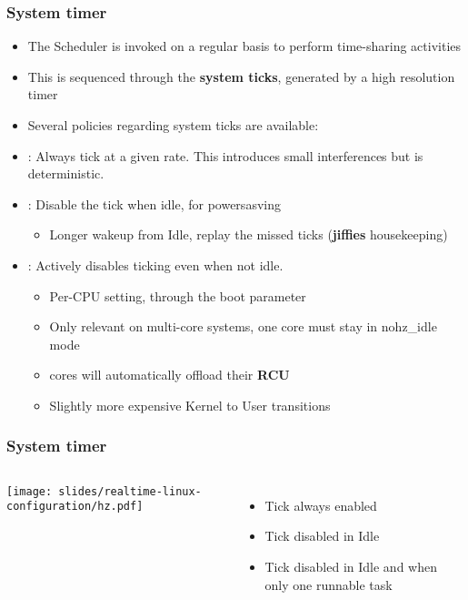 \begin{frame}
	\frametitle{System timer}
	\begin{itemize}
		\item The Scheduler is invoked on a regular basis to perform time-sharing activities
		\item This is sequenced through the \textbf{system ticks}, generated by a high resolution timer
		\item Several policies regarding system ticks are available:
		\item {}: Always tick at a given rate. This introduces small interferences but is deterministic.
		\item {}: Disable the tick when idle, for powersasving
			\begin{itemize}
				\item Longer wakeup from Idle, replay the missed ticks (\textbf{jiffies} housekeeping)
			\end{itemize}
		\item {}: Actively disables ticking even when not idle.
			\begin{itemize}
				\item Per-CPU setting, through the  boot parameter
				\item Only relevant on multi-core systems, one core must stay in nohz\_idle mode
				\item {} cores will automatically offload their \textbf{RCU}
				\item Slightly more expensive Kernel to User transitions
			\end{itemize}
	\end{itemize}
\end{frame}

\begin{frame}
	\frametitle{System timer}
	\begin{columns}
	\texttt{[image: slides/realtime-linux-configuration/hz.pdf]}
		\begin{itemize}
			\item Tick always enabled \\
				\vspace{1.3cm}
			\item Tick disabled in Idle \\
				\vspace{1.3cm}
			\item Tick disabled in Idle and when only one runnable task
		\end{itemize}
	\end{columns}
\end{frame}


